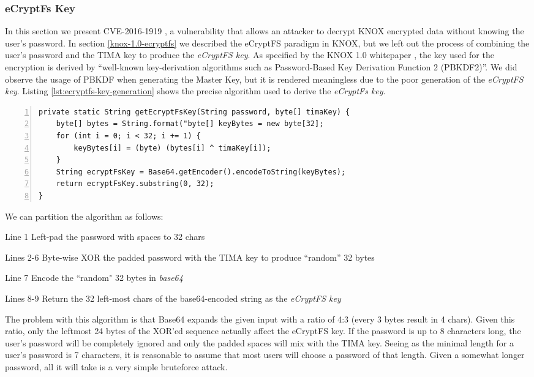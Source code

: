 \documentclass[11pt]{article}
\begin{document}
\subsubsection{eCryptFs Key} \label{knox-1.0-ecryptfs-key}
In this section we present CVE-2016-1919 \cite{CVE-2016-1919}, a vulnerability that allows an attacker to decrypt KNOX encrypted 
data without knowing the user's password.
In section \ref{knox-1.0-ecryptfs} we described the eCryptFS paradigm in KNOX, but we left out the process of combining the user's
password and the TIMA key to produce the \emph{eCryptFS key}. As specified by the KNOX 1.0 whitepaper \cite{AnOverviewOfSamsungKNOX1}, 
the key used for the encryption is derived by ``well-known key-derivation algorithms such as Password-Based Key Derivation Function 2 (PBKDF2)''.
We did observe the usage of PBKDF when generating the Master Key, but it is rendered meaningless due to the poor generation of the \emph{eCryptFS key}. 
Listing \ref{lst:ecryptfs-key-generation} shows the precise algorithm used to derive the \emph{eCryptFs key}. 

\begin{lstlisting}[float=h, breaklines=true, numbers=left, caption={eCryptFS Key Generation}, label={lst:ecryptfs-key-generation}]
private static String getEcryptFsKey(String password, byte[] timaKey) {
    byte[] bytes = String.format("byte[] keyBytes = new byte[32];
    for (int i = 0; i < 32; i += 1) {
        keyBytes[i] = (byte) (bytes[i] ^ timaKey[i]);
    }
    String ecryptFsKey = Base64.getEncoder().encodeToString(keyBytes);
    return ecryptFsKey.substring(0, 32);
}
\end{lstlisting}

We can partition the algorithm as follows:
\begin{compactdesc}
\item [Line 1] Left-pad the password with spaces to 32 chars
\item [Lines 2-6] Byte-wise XOR the padded password with the TIMA key to produce ``random'' 32 bytes
\item [Line 7] Encode the ``random" 32 bytes in \emph{base64}
\item [Lines 8-9] Return the 32 left-most chars of the base64-encoded string as the \emph{eCryptFS key}
\end{compactdesc}
The problem with this algorithm is that Base64 expands the given input with a ratio of 4:3 (every 3 bytes result in 4 chars).
Given this ratio, only the leftmost 24 bytes of the XOR'ed sequence actually affect the eCryptFS key.
If the password is up to 8 characters long, the user's password will be completely ignored and only the padded spaces will mix with the TIMA key.
Seeing as the minimal length for a user's password is 7 characters, it is reasonable to assume that most users will choose a password of that length. 
Given a somewhat longer password, all it will take is a very simple bruteforce attack.
\end{document}
